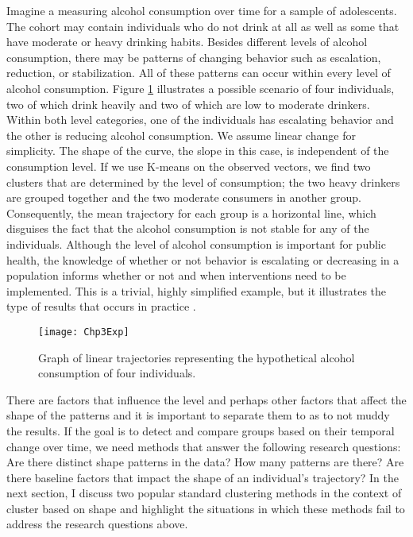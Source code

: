 Imagine a measuring alcohol consumption over time for a sample of adolescents. The cohort may contain individuals who do not drink at all as well as some that have moderate or heavy drinking habits. Besides different levels of alcohol consumption, there may be patterns of changing behavior such as escalation, reduction, or stabilization. All of these patterns can occur within every level of alcohol consumption. Figure \ref{fig:3-1} illustrates a possible scenario of four individuals, two of which drink heavily and two of which are low to moderate drinkers. Within both level categories, one of the individuals has escalating behavior and the other is reducing alcohol consumption. We assume linear change for simplicity. The shape of the curve, the slope in this case, is independent of the consumption level. If we use K-means on the observed vectors, we find two clusters that are determined by the level of consumption; the two heavy drinkers are grouped together and the two moderate consumers in another group. Consequently, the mean trajectory for each group is a horizontal line, which disguises the fact that the alcohol consumption is not stable for any of the individuals. Although the level of alcohol consumption is important for public health, the knowledge of whether or not behavior is escalating or decreasing in a population informs whether or not and when interventions need to be implemented. This is a trivial, highly simplified example, but it illustrates the type of results that occurs in practice \cite{mccoy2010}.

\begin{figure}
\begin{center}
\texttt{[image: Chp3Exp]}
\end{center}
\caption{Graph of linear trajectories representing the hypothetical alcohol consumption of four individuals.}
\label{fig:3-1}
\end{figure}

There are factors that influence the level and perhaps other factors that affect the shape of the patterns and it is important to separate them to as to not muddy the results. If the goal is to detect and compare groups based on their temporal change over time, we need methods that answer the following research questions: Are there distinct shape patterns in the data? How many patterns are there? Are there baseline factors that impact the shape of an individual's trajectory? In the next section, I discuss two popular standard clustering methods in the context of cluster based on shape and highlight the situations in which these methods fail to address the research questions above. 
